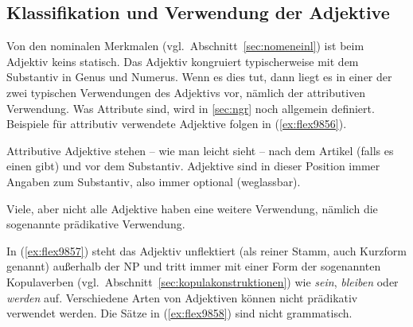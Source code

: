 \label{sec:adjektive}

\subsection{Klassifikation und Verwendung der Adjektive}

\label{sec:adjektivklassifikation}


Von den nominalen Merkmalen (vgl.\ Abschnitt~\ref{sec:nomeneinl}) ist beim Adjektiv keins statisch.
Das Adjektiv kongruiert typischerweise mit dem Substantiv in Genus und Numerus.
Wenn es dies tut, dann liegt es in einer der zwei typischen Verwendungen des Adjektivs vor, nämlich der attributiven Verwendung.
Was Attribute sind, wird in \ref{sec:ngr} noch allgemein definiert.
Beispiele für attributiv verwendete Adjektive folgen in (\ref{ex:flex9856}).


\begin{exe}
  \ex \label{ex:flex9856}
  \begin{xlist}
  \end{xlist}
\end{exe}

Attributive Adjektive stehen -- wie man leicht sieht -- nach dem Artikel (falls es einen gibt) und vor dem Substantiv.
Adjektive sind in dieser Position immer Angaben zum Substantiv, also immer optional (weglassbar).

Viele, aber nicht alle Adjektive haben eine weitere Verwendung, nämlich die sogenannte prädikative Verwendung.

\begin{exe}
  \ex \label{ex:flex9857}
  \begin{xlist}
  \end{xlist}
\end{exe}


In (\ref{ex:flex9857}) steht das Adjektiv unflektiert (als reiner Stamm, auch Kurzform genannt) außerhalb der NP und tritt immer mit einer Form der sogenannten Kopulaverben (vgl.\ Abschnitt~\ref{sec:kopulakonstruktionen}) wie \textit{sein}, \textit{bleiben} oder \textit{werden} auf.
Verschiedene Arten von Adjektiven können nicht prädikativ verwendet werden.
Die Sätze in (\ref{ex:flex9858}) sind nicht grammatisch.

